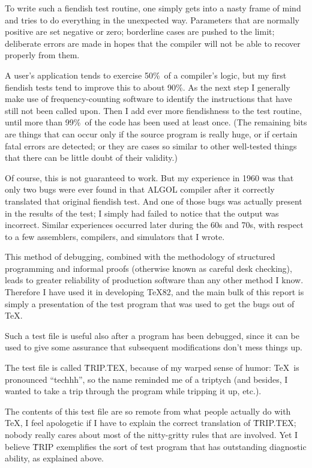 To write such a fiendish test routine, one simply gets into a nasty frame
of mind and tries to do everything in the unexpected way. Parameters
that are normally positive are set negative or zero; borderline cases
are pushed to the limit; deliberate errors are made in hopes that the
compiler will not be able to recover properly from them.

A user's application tends to exercise 50\%\ of a compiler's logic,
but my first fiendish tests tend to improve this to about 90\%. As the
next step I generally make use of frequency-counting software to identify
the instructions that have still not been called upon. Then I add ever more
fiendishness to the test routine, until more than 99\%\ of the code
has been used at least once. (The remaining bits are things that
can occur only if the source program is really huge, or if certain
fatal errors are detected; or they are cases so similar to other well-tested
things that there can be little doubt of their validity.)

Of course, this is not guaranteed to work. But my experience in 1960 was
that only two bugs were ever found in that {\mc ALGOL} compiler after it
correctly translated that original fiendish test. And one of those bugs
was actually present in the results of the test; I simply had failed to
notice that the output was incorrect. Similar experiences occurred later
during the 60s and 70s, with respect to a few assemblers, compilers,
and simulators that I wrote.

This method of debugging, combined with the methodology of structured
programming and informal proofs (otherwise known as careful desk checking),
leads to greater reliability of production software than any other
method I know. Therefore I have used it in developing \TeX82, and the
main bulk of this report is simply a presentation of the test program
that was used to get the bugs out of \TeX.

Such a test file is useful also after a program has been debugged, since
it can be used to give some assurance that subsequent modifications don't
mess things up.

The test file is called \.{TRIP.TEX}, because of my warped sense of humor:
\TeX\ is pronounced ``techhh'', so the name reminded me of a
triptych (and besides, I wanted to take a trip through the program while
tripping it up, etc.).

The contents of this test file are so remote from what people actually
do with \TeX, I feel apologetic if I have to explain the correct
translation of \.{TRIP.TEX}; nobody really cares about most of the
nitty-gritty rules that are involved. Yet I believe \.{TRIP} exemplifies
the sort of test program that has outstanding diagnostic ability, as
explained above.

